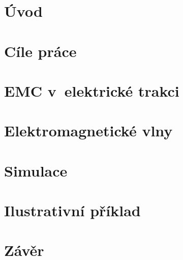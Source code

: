 \documentclass[a4paper, oneside, 11pt]{book}
\begin{document}
%



\renewcommand\thepage{}

\tableofcontents
\newpage

\renewcommand\thepage{\arabic{page}}
\setcounter{page}{1}

\chapter{Úvod}


\chapter{Cíle práce} \label{kap:Cile}


\chapter{EMC v~elektrické trakci} \label{kap:EMC}


\chapter{Elektromagnetické vlny} \label{kap:Evlny}


\chapter{Simulace} \label{kap:Simulace}


\chapter{Ilustrativní příklad} \label{kap:Priklad}

%
\chapter{Závěr} \label{kap:Zaver}




\listoffigures
\listoftables
\newpage

\appendix



\end{document}

